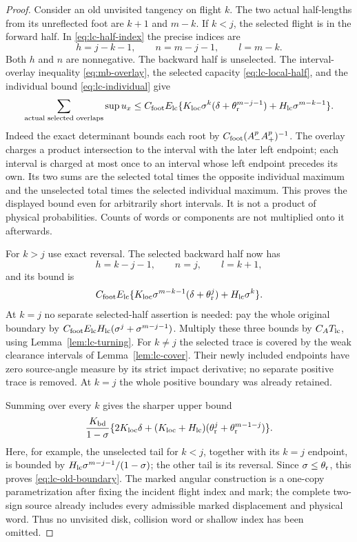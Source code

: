\begin{proof}
Consider an old unvisited tangency on flight $k$.  The two actual
half-lengths from its unreflected foot are $k+1$ and $m-k$.
If $k<j$, the selected flight is in the forward half.  In
\eqref{eq:lc-half-index} the precise indices are
\[
 h=j-k-1,\qquad n=m-j-1,\qquad l=m-k.
\]
Both $h$ and $n$ are nonnegative.  The backward half is unselected.
The interval-overlay inequality \eqref{eq:mb-overlay}, the
selected capacity \eqref{eq:lc-local-half}, and the individual
bound \eqref{eq:lc-individual} give
\[
 \sum_{\text{actual selected overlaps}}\sup u_x
 \le C_{\rm foot}E_{\rm lc}
 \{K_{\rm loc}\sigma^k(\delta+\theta_{\rm r}^{m-j-1})
                             +H_{\rm lc}\sigma^{m-k-1}\}.
\]
Indeed the exact determinant bounds each root by
$C_{\rm foot}(A_-^pA_+^p)^{-1}$.  The overlay charges a product
intersection to the interval with the later left endpoint; each
interval is charged at most once to an interval whose left endpoint
precedes its own.  Its two sums are the selected total times the
opposite individual maximum and the unselected total times the
selected individual maximum.  This proves the displayed bound even
for arbitrarily short intervals.  It is not a product of physical
probabilities.  Counts of words or components are not multiplied
onto it afterwards.

For $k>j$ use exact reversal.  The selected backward half now has
\[
 h=k-j-1,\qquad n=j,\qquad l=k+1,
\]
and its bound is
\[
 C_{\rm foot}E_{\rm lc}
 \{K_{\rm loc}\sigma^{m-k-1}(\delta+\theta_{\rm r}^{j})
                             +H_{\rm lc}\sigma^k\}.
\]
At $k=j$ no separate selected-half assertion is needed: pay the
whole original boundary by
$C_{\rm foot}E_{\rm lc}H_{\rm lc}
 (\sigma^j+\sigma^{m-j-1})$.
Multiply these three bounds by $C_AT_{\rm lc}$, using
Lemma~\ref{lem:lc-turning}.  For $k\ne j$ the selected trace is
covered by the weak clearance intervals of Lemma~\ref{lem:lc-cover}.
Their newly included endpoints have zero source-angle measure by
its strict impact derivative; no separate positive trace is removed.
At $k=j$ the whole positive boundary was already retained.

Summing over every $k$ gives the sharper upper bound
\[
 \frac{K_{\rm bd}}{1-\sigma}
 \{2K_{\rm loc}\delta+
 (K_{\rm loc}+H_{\rm lc})
          (\theta_{\rm r}^j+\theta_{\rm r}^{m-1-j})\}.
\]
Here, for example, the unselected tail for $k<j$, together with
its $k=j$ endpoint, is bounded by
$H_{\rm lc}\sigma^{m-j-1}/(1-\sigma)$; the other tail is its
reversal.  Since $\sigma\le\theta_{\rm r}$, this proves
\eqref{eq:lc-old-boundary}.  The marked angular construction is a
one-copy parametrization after fixing the incident flight index and
mark; the complete two-sign source already includes every admissible
marked displacement and physical word.  Thus no unvisited disk,
collision word or shallow index has been omitted.


\end{proof}
